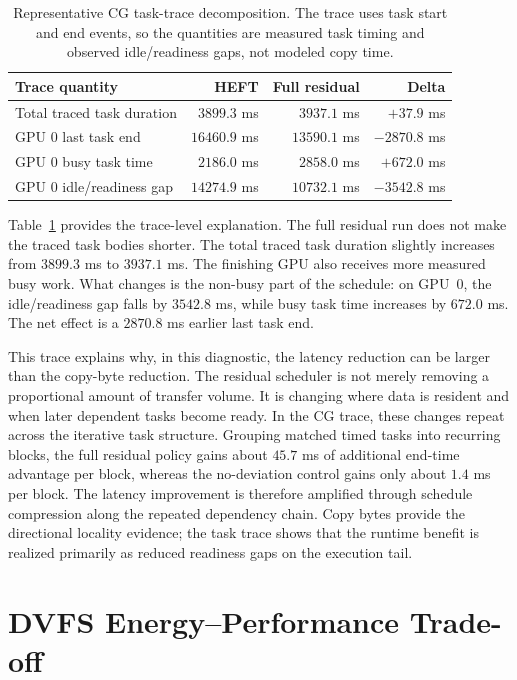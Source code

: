 \begin{table}[!htbp]
\centering
\footnotesize
\setlength{\tabcolsep}{5pt}
\begin{tabular}{@{}lrrr@{}}
\toprule
Trace quantity & HEFT & Full residual & Delta \\
\midrule
Total traced task duration & \(3899.3\) ms & \(3937.1\) ms & \(+37.9\) ms \\
GPU 0 last task end & \(16460.9\) ms & \(13590.1\) ms & \(-2870.8\) ms \\
GPU 0 busy task time & \(2186.0\) ms & \(2858.0\) ms & \(+672.0\) ms \\
GPU 0 idle/readiness gap & \(14274.9\) ms & \(10732.1\) ms & \(-3542.8\) ms \\
\bottomrule
\end{tabular}
\caption{Representative CG task-trace decomposition. The trace uses task start and end events, so the quantities are measured task timing and observed idle/readiness gaps, not modeled copy time.}
\label{tab:results-cg-trace-gap}
\end{table}

Table~\ref{tab:results-cg-trace-gap} provides the trace-level explanation. The
full residual run does not make the traced task bodies shorter. The total traced
task duration slightly increases from \(3899.3\) ms to \(3937.1\) ms. The
finishing GPU also receives more measured busy work. What changes is the
non-busy part of the schedule: on GPU~0, the idle/readiness gap falls by
\(3542.8\) ms, while busy task time increases by \(672.0\) ms. The net
effect is a \(2870.8\) ms earlier last task end.

This trace explains why, in this diagnostic, the latency reduction can be larger
than the copy-byte reduction. The residual scheduler is not merely removing a
proportional amount of transfer volume. It is changing where data is resident
and when later dependent tasks become ready. In the CG trace, these changes
repeat across the iterative task structure. Grouping matched timed tasks into
recurring blocks, the full residual policy gains about \(45.7\) ms of additional
end-time advantage per block, whereas the no-deviation control gains only about
\(1.4\) ms per block. The latency improvement is therefore amplified through
schedule compression along the repeated dependency chain. Copy bytes provide the
directional locality evidence; the task trace shows that the runtime benefit is
realized primarily as reduced readiness gaps on the execution tail.

\section{DVFS Energy--Performance Trade-off}
\label{sec:results-dvfs-energy}

